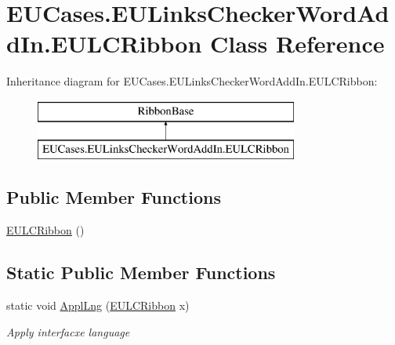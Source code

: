 \hypertarget{class_e_u_cases_1_1_e_u_links_checker_word_add_in_1_1_e_u_l_c_ribbon}{\section{E\+U\+Cases.\+E\+U\+Links\+Checker\+Word\+Add\+In.\+E\+U\+L\+C\+Ribbon Class Reference}
\label{class_e_u_cases_1_1_e_u_links_checker_word_add_in_1_1_e_u_l_c_ribbon}
}
Inheritance diagram for E\+U\+Cases.\+E\+U\+Links\+Checker\+Word\+Add\+In.\+E\+U\+L\+C\+Ribbon\+:\begin{figure}[H]
\begin{center}
\leavevmode
\includegraphics[height=2.000000cm]{class_e_u_cases_1_1_e_u_links_checker_word_add_in_1_1_e_u_l_c_ribbon}
\end{center}
\end{figure}
\subsection*{Public Member Functions}
\begin{DoxyCompactItemize}
\item 
\hyperlink{class_e_u_cases_1_1_e_u_links_checker_word_add_in_1_1_e_u_l_c_ribbon_a4254165e93672b0987577c3403d3706f}{E\+U\+L\+C\+Ribbon} ()
\end{DoxyCompactItemize}
\subsection*{Static Public Member Functions}
\begin{DoxyCompactItemize}
\item 
static void \hyperlink{class_e_u_cases_1_1_e_u_links_checker_word_add_in_1_1_e_u_l_c_ribbon_afee099ee3e4c594242cc3fe8668c2cee}{Appl\+Lng} (\hyperlink{class_e_u_cases_1_1_e_u_links_checker_word_add_in_1_1_e_u_l_c_ribbon}{E\+U\+L\+C\+Ribbon} x)
\begin{DoxyCompactList}\small\item\em Apply interfacxe language \end{DoxyCompactList}\end{DoxyCompactItemize}

